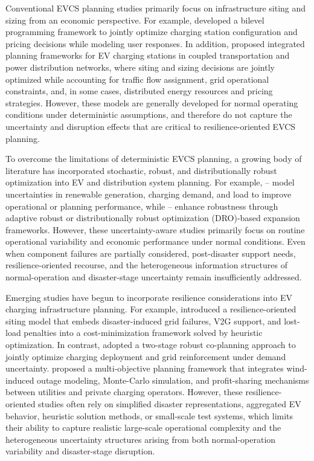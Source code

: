 \documentclass[journal]{IEEEtran}
\providecommand{\1}{\mathbf{1}}
\begin{document}
Conventional EVCS planning studies primarily focus on infrastructure siting and sizing from an economic perspective. For example, \cite{zeng2020bilevel} developed a bilevel programming framework to jointly optimize charging station configuration and pricing decisions while modeling user responses. In addition, \cite{ferro2022coupledEVCS,kapoor2024fastEVCS,ferraz2025pricingEVCS} proposed integrated planning frameworks for EV charging stations in coupled transportation and power distribution networks, where siting and sizing decisions are jointly optimized while accounting for traffic flow assignment, grid operational constraints, and, in some cases, distributed energy resources and pricing strategies. However, these models are generally developed for normal operating conditions under deterministic assumptions, and therefore do not capture the uncertainty and disruption effects that are critical to resilience-oriented EVCS planning.

To overcome the limitations of deterministic EVCS planning, a growing body of literature has incorporated stochastic, robust, and distributionally robust optimization into EV and distribution system planning. For example, \cite{dong2025stochasticEVCS}–\cite{yu2025mallEVCS}  model uncertainties in renewable generation, charging demand, and load to improve operational or planning performance, while \cite{cui2025adaptiveEVCS}–\cite{li2025msdroHCS}  enhance robustness through adaptive robust or distributionally robust optimization (DRO)-based expansion frameworks. However, these uncertainty-aware studies primarily focus on routine operational variability and economic performance under normal conditions. Even when component failures are partially considered, post-disaster support needs, resilience-oriented recourse, and the heterogeneous information structures of normal-operation and disaster-stage uncertainty remain insufficiently addressed.

Emerging studies have begun to incorporate resilience considerations into EV charging infrastructure planning. For example, \cite{Mei2025EVCSResilience} introduced a resilience-oriented siting model that embeds disaster-induced grid failures, V2G support, and lost-load penalties into a cost-minimization framework solved by heuristic optimization. In contrast, \cite{Wen2025RobustEVCS} adopted a two-stage robust co-planning approach to jointly optimize charging deployment and grid reinforcement under demand uncertainty. \cite{Akhgarzarandy2021EVCSResilience} proposed a multi-objective planning framework that integrates wind-induced outage modeling, Monte-Carlo simulation, and profit-sharing mechanisms between utilities and private charging operators. However, these resilience-oriented studies often rely on simplified disaster representations, aggregated EV behavior, heuristic solution methods, or small-scale test systems, which limits their ability to capture realistic large-scale operational complexity and the heterogeneous uncertainty structures arising from both normal-operation variability and disaster-stage disruption.
\end{document}
